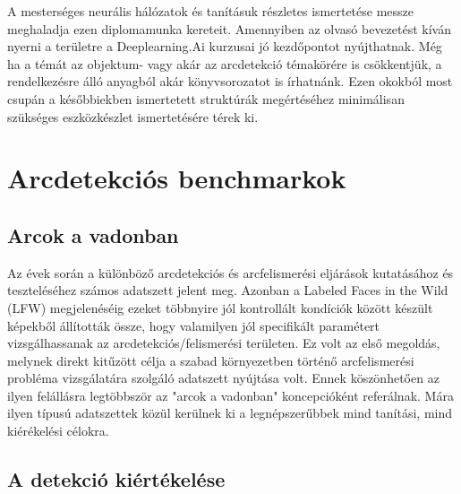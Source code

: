 A mesterséges neurális hálózatok és tanításuk részletes ismertetése messze meghaladja ezen diplomamunka kereteit. Amennyiben az olvasó bevezetést kíván nyerni a területre a Deeplearning.Ai\cite{noauthor_deeplearningai_nodate} kurzusai jó kezdőpontot nyújthatnak. Még ha a témát az objektum- vagy akár az arcdetekció témakörére is csökkentjük, a rendelkezésre álló anyagból akár könyvsorozatot is írhatnánk. Ezen okokból most csupán a későbbiekben ismertetett struktúrák megértéséhez minimálisan szükséges eszközkészlet ismertetésére térek ki.

\section{Arcdetekciós benchmarkok}

\subsection{Arcok a vadonban}
Az évek során a különböző arcdetekciós és arcfelismerési eljárások kutatásához és teszteléséhez számos adatszett jelent meg. Azonban a Labeled Faces in the Wild (LFW) megjelenéséig ezeket többnyire jól kontrollált kondíciók között készült képekből állították össze, hogy valamilyen jól specifikált paramétert vizsgálhassanak az arcdetekciós/felismerési területen\cite{huang_labeled_2008}. Ez volt az első megoldás, melynek direkt kitűzött célja a szabad környezetben történő arcfelismerési probléma vizsgálatára szolgáló adatszett nyújtása volt. Ennek köszönhetően az ilyen felállásra legtöbbször az "arcok a vadonban" koncepcióként referálnak. Mára ilyen típusú adatszettek közül kerülnek ki a legnépszerűbbek mind tanítási, mind kiérékelési célokra.


\subsection{A detekció kiértékelése}

